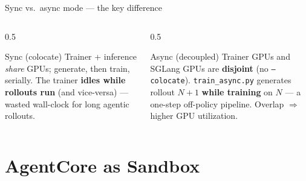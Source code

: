 \documentclass[aspectratio=169]{beamer}
\begin{document}
\begin{frame}{Sync vs.\ async mode --- the key difference}
  \begin{columns}[T]
    \begin{column}{0.5\textwidth}
      \begin{block}{Sync (colocate)}
        \scriptsize Trainer + inference \emph{share} GPUs; generate, then train, serially.
        The trainer \textbf{idles while rollouts run} (and vice-versa) --- wasted wall-clock
        for long agentic rollouts.
      \end{block}
    \end{column}
    \begin{column}{0.5\textwidth}
      \begin{block}{Async (decoupled)}
        \scriptsize Trainer GPUs and SGLang GPUs are \textbf{disjoint} (no \texttt{--colocate}).
        \texttt{train\_async.py} generates rollout $N{+}1$ \textbf{while training} on $N$ ---
        a one-step off-policy pipeline. Overlap $\Rightarrow$ higher GPU utilization.
      \end{block}
    \end{column}
  \end{columns}
  \vspace{0.2em}
  \begin{center}
  \end{center}
\end{frame}

\section{AgentCore as Sandbox}
\end{document}
